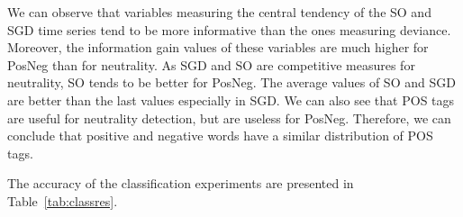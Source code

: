 \documentclass{sig-alternate}
\begin{document}
 
 
 
 


We can observe that variables measuring the central tendency of the SO and SGD time series tend to be more informative than the ones measuring deviance. Moreover, the information gain values of these variables are much higher for PosNeg than for neutrality. As SGD and SO are competitive measures for neutrality, SO tends to be better for PosNeg. The average values of SO and SGD are better than the last values especially in SGD. We can also see that POS tags are useful for neutrality detection, but are useless for PosNeg. Therefore, we can conclude that positive and negative words have a similar distribution of POS tags. 


The accuracy of the classification experiments are presented in Table~\ref{tab:classres}. 
\end{document}
